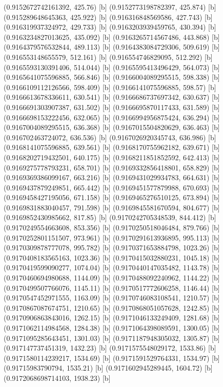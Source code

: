 {{{(0.9152672742161392, 425.76) [b] 
(0.9152773198782397, 425.874) [b] 
(0.915289648645363, 425.922) [b] 
(0.916316848569586, 427.743) [b] 
(0.916319937324972, 429.733) [b] 
(0.9163203939459765, 430.394) [b] 
(0.9163234827013625, 435.092) [b] 
(0.9163265714567486, 443.868) [b] 
(0.9164379576532844, 489.113) [b] 
(0.9164383084729306, 509.619) [b] 
(0.916553148655579, 512.161) [b] 
(0.916554746829095, 512.292) [b] 
(0.9165593130391406, 514.044) [b] 
(0.9165595413496429, 564.073) [b] 
(0.9165641075596885, 566.846) [b] 
(0.9166004089295515, 598.338) [b] 
(0.9166109112126566, 598.409) [b] 
(0.9166141075596885, 598.57) [b] 
(0.9166613678336611, 630.541) [b] 
(0.9166686737697342, 630.637) [b] 
(0.9166691303907387, 631.502) [b] 
(0.9166695870117433, 631.589) [b] 
(0.9166698153222456, 632.065) [b] 
(0.9166994956875424, 636.294) [b] 
(0.9167004089295515, 636.368) [b] 
(0.9167015504820629, 636.463) [b] 
(0.916702463724072, 636.536) [b] 
(0.9167026920345743, 636.986) [b] 
(0.9168141075596885, 639.561) [b] 
(0.9168170755962182, 639.671) [b] 
(0.9168202719432501, 640.175) [b] 
(0.9168211851852592, 642.413) [b] 
(0.9169275778793231, 658.701) [b] 
(0.9169332856418801, 658.829) [b] 
(0.9169369386099167, 663.216) [b] 
(0.9169431029934783, 664.631) [b] 
(0.9169437879249851, 665.442) [b] 
(0.9169451577879988, 670.693) [b] 
(0.9169458427195056, 671.158) [b] 
(0.9169465276510125, 673.894) [b] 
(0.9169831883040457, 791.598) [b] 
(0.9169845581670594, 804.677) [b] 
(0.9169852430985662, 817.85) [b] 
(0.9170242705348539, 844.412) [b] 
(0.9170249554663608, 853.356) [b] 
(0.9170250518046484, 879.766) [b] 
(0.9170252801151507, 973.961) [b] 
(0.9170291613936895, 995.113) [b] 
(0.9170309878777078, 995.782) [b] 
(0.9170371653884798, 1023.26) [b] 
(0.9170408183565163, 1023.36) [b] 
(0.9170415032880231, 1045.18) [b] 
(0.9170419599090277, 1074.04) [b] 
(0.9170440147035482, 1143.78) [b] 
(0.9170460694980688, 1144.09) [b] 
(0.9170488092240962, 1144.22) [b] 
(0.9170499507766076, 1145.11) [b] 
(0.9170517772606258, 1146.44) [b] 
(0.9170547452971555, 1163.09) [b] 
(0.9170746083108541, 1210.57) [b] 
(0.9170867087674751, 1210.65) [b] 
(0.9170868051057628, 1242.85) [b] 
(0.9170906863843016, 1262.15) [b] 
(0.9171046133249409, 1281.68) [b] 
(0.9171062114984568, 1284.38) [b] 
(0.9171064398089591, 1300.05) [b] 
(0.9171095285643451, 1301.03) [b] 
(0.9171187948305032, 1305.87) [b] 
(0.917147737451319, 1432.23) [b] 
(0.9171575548029172, 1533.86) [b] 
(0.9171580114239217, 1534.69) [b] 
(0.9171591529764331, 1534.97) [b] 
(0.91715983790794, 1535.21) [b] 
(0.9171602945289445, 1604.72) [b] 
(0.9172068698714103, 1938.23) [b] 
}}}
